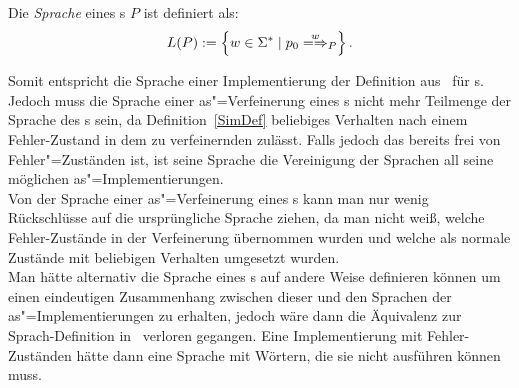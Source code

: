 \vspace{0.2cm}

\begin{Def}[Sprache]
  \label{LDef}
  Die \emph{Sprache} eines \MEIO{}s $P$ ist definiert als:
  \[L(P) := \left\{w\in \Sigma ^* \mid p_0\weakmay[w]_P \right\}.\]
\end{Def}

Somit entspricht die Sprache einer Implementierung der Definition
aus~\cite{Schinko2016BA} für \EIO{}s. Jedoch muss die Sprache einer
as"=Verfeinerung eines \MEIO{}s nicht mehr Teilmenge der Sprache des \MEIO{}s
sein, da Definition~\ref{SimDef} beliebiges Verhalten nach einem Fehler-Zustand
in dem zu verfeinernden \MEIO{} zulässt. Falls jedoch das \MEIO{} bereits frei
von Fehler"=Zuständen ist, ist seine Sprache die Vereinigung der Sprachen all
seine möglichen as"=Implementierungen.\\
Von der Sprache einer as"=Verfeinerung eines \MEIO{}s kann man nur wenig
Rückschlüsse auf die ursprüngliche Sprache ziehen, da man nicht weiß,
welche Fehler-Zustände in der Verfeinerung übernommen wurden und welche als
normale Zustände mit beliebigen Verhalten umgesetzt wurden.\\
Man hätte alternativ die Sprache eines \MEIO{}s auf andere Weise definieren
können um einen eindeutigen Zusammenhang zwischen dieser und den Sprachen der
as"=Implementierungen zu erhalten, jedoch wäre dann die Äquivalenz zur \EIO{}
Sprach-Definition in~\cite{Schinko2016BA} verloren gegangen. Eine
Implementierung mit Fehler-Zuständen hätte dann eine Sprache mit Wörtern, die
sie nicht ausführen können muss.
